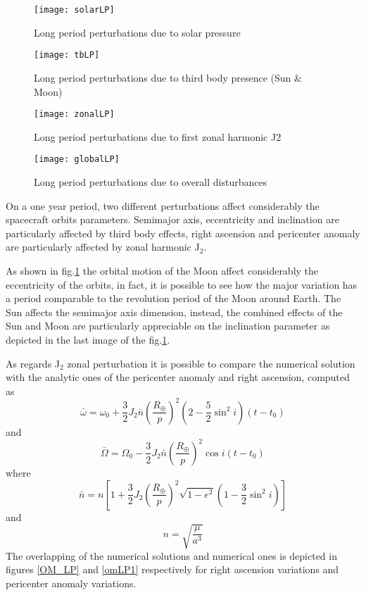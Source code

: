 \begin{figure}[htp]
\centering
\texttt{[image: solarLP]}
\caption{Long period perturbations due to solar pressure}
\end{figure}

\begin{figure}[p]
\centering
\texttt{[image: tbLP]}
\caption{Long period perturbations due to third body presence (Sun $\&$ Moon)}
\label{tbSP}
\end{figure}

\begin{figure}[htp]
\centering
\texttt{[image: zonalLP]}
\caption{Long period perturbations due to first zonal harmonic J2}
\end{figure}

\begin{figure}[hth]
\centering
\texttt{[image: globalLP]}
\caption{Long period perturbations due to overall disturbances}
\label{global}
\end{figure}

On a one year period, two different perturbations affect considerably the spacecraft orbits parameters. Semimajor axis, eccentricity and inclination are particularly affected by third body effects, right ascension and pericenter anomaly are particularly affected by zonal harmonic J$_2$.

As shown in fig.\ref{tbSP} the orbital motion of the Moon affect considerably the eccentricity of the orbits, in fact, it is possible to see how the major variation has a period comparable to the revolution period of the Moon around Earth. The Sun affects the semimajor axis dimension, instead, the combined effects of the Sun and Moon are particularly appreciable on the inclination parameter as depicted in the last image of the fig.\ref{tbSP}.

As regards J$_2$ zonal perturbation it is possible to compare the numerical solution with the analytic ones \cite{mengali} of the pericenter anomaly and right ascension, computed as
\begin{equation}
\bar{\omega}=\omega_0+\frac{3}{2}J_2\bar{n}\left(\frac{R_{\oplus}}{p}\right)^2(2-\frac{5}{2}\sin^2{i})(t-t_0)
\label{OManal}
\end{equation}
and
\begin{equation}
\bar{\Omega}=\Omega_0-\frac{3}{2}J_2\bar{n}\left(\frac{R_{\oplus}}{p}\right)^2\cos{i}(t-t_0)
\label{omanal}
\end{equation}
where
\[
\bar{n}=n\left[1+\frac{3}{2}J_2\left(\frac{R_{\oplus}}{p}\right)^2\sqrt{1-e^2}\left(1-\frac{3}{2}\sin^2{i}\right)\right]
\]
and
\[
n=\sqrt{\frac{\mu}{a^3}}
\]
The overlapping of the numerical solutions and numerical ones is depicted in figures \ref{OM_LP} and \ref{omLP1} respectively for right ascension variations and pericenter anomaly variations.

